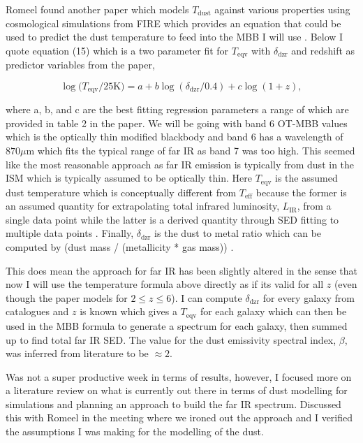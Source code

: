 \documentclass[a4paper, 11pt, oneside]{researchjournal} %
\begin{document}
Romeel found another paper which models $T_\text{dust}$ against various properties using cosmological simulations from FIRE which provides an equation that could be used to predict the dust temperature to feed into the MBB I will use \parencite{liangDustTemperaturesHighredshift2019}. Below I quote equation (15) which is a two parameter fit for $T_\text{eqv}$ with $\delta_\text{dzr}$ and redshift as predictor variables from the paper,

\begin{equation}
    \log({T_\text{eqv}/25\text{K}) = a + b \log{(\delta_\text{dzr}/0.4)}+ c \log(1+z)},
    \label{eq:equivalentDustTemp}
\end{equation}

\noindent where a, b, and c are the best fitting regression parameters a range of which are provided in table 2 in the paper. We will be going with band 6 OT-MBB values which is the optically thin modified blackbody and band 6 has a wavelength of $870\mu\text{m}$ which fits the typical range of far IR as band 7 was too high. This seemed like the most reasonable approach as far IR emission is typically from dust in the ISM which is typically assumed to be optically thin. Here $T_\text{eqv}$ is the assumed dust temperature which is conceptually different from $T_\text{eff}$ because the former is an assumed quantity for extrapolating total infrared luminosity, $L_\text{IR}$, from a single data point while the latter is a derived quantity through SED fitting to multiple data points \parencite{liangDustTemperaturesHighredshift2019}. Finally, $\delta_\text{dzr}$ is the dust to metal ratio which can be computed by (dust mass / (metallicity * gas mass)) \cite{liDusttoGasDusttoMetalsRatio2019}.

This does mean the approach for far IR has been slightly altered in the sense that now I will use the temperature formula above directly as if its valid for all $z$ (even though the paper models for $2 \le z \le 6$). I can compute $\delta_\text{dzr}$ for every galaxy from catalogues and $z$ is known which gives a $T_\text{eqv}$ for each galaxy which can then be used in the MBB formula to generate a spectrum for each galaxy, then summed up to find total far IR SED. The value for the dust emissivity spectral index, $\beta$, was inferred from literature to be $\approx 2$.

Was not a super productive week in terms of results, however, I focused more on a literature review on what is currently out there in terms of dust modelling for simulations and planning an approach to build the far IR spectrum. Discussed this with Romeel in the meeting where we ironed out the approach and I verified the assumptions I was making for the modelling of the dust.
\end{document}
